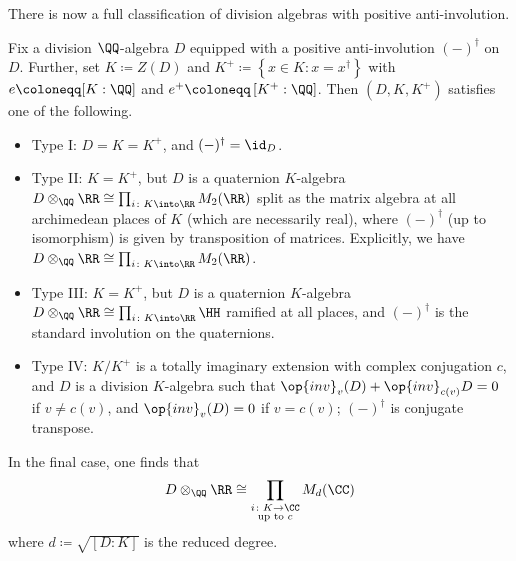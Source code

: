 \documentclass[../notes.tex]{subfiles}
\begin{document}
There is now a full classification of division algebras with positive anti-involution.
\begin{theorem}[Albert]
	Fix a division $\QQ$-algebra $D$ equipped with a positive anti-involution $(-)^\dagger$ on $D$. Further, set $K\coloneqq Z(D)$ and $K^+\coloneqq\left\{x\in K:x=x^\dagger\right\}$ with $e\coloneqq[K:\QQ]$ and $e^+\coloneqq\left[K^+:\QQ\right]$. Then $(D,K,K^+)$ satisfies one of the following.
	\begin{itemize}
		\item Type I: $D=K=K^+$, and $(-)^\dagger=\id_D$.
		\item Type II: $K=K^+$, but $D$ is a quaternion $K$-algebra $D\otimes_\QQ\RR\cong\prod_{i\colon K\into\RR}M_2(\RR)$ split as the matrix algebra at all archimedean places of $K$ (which are necessarily real), where $(-)^\dagger$ (up to isomorphism) is given by transposition of matrices. Explicitly, we have $D\otimes_\QQ\RR\cong\prod_{i\colon K\into\RR}M_2(\RR)$.
		\item Type III: $K=K^+$, but $D$ is a quaternion $K$-algebra $D\otimes_\QQ\RR\cong\prod_{i\colon K\into\RR}\HH$ ramified at all places, and $(-)^\dagger$ is the standard involution on the quaternions.
		\item Type IV: $K/K^+$ is a totally imaginary extension with complex conjugation $c$, and $D$ is a division $K$-algebra such that $\op{inv}_v(D)+\op{inv}_{c(v)}D=0$ if $v\ne c(v)$, and $\op{inv}_v(D)=0$ if $v=c(v)$; $(-)^\dagger$ is conjugate transpose.
	\end{itemize}
\end{theorem}
\begin{remark}
	In the final case, one finds that
	\[D\otimes_\QQ\RR\cong\prod_{\substack{i\colon K\to\CC\\\text{up to }c}}M_d(\CC)\]
	where $d\coloneqq\sqrt{[D:K]}$ is the reduced degree.
\end{remark}
\end{document}
